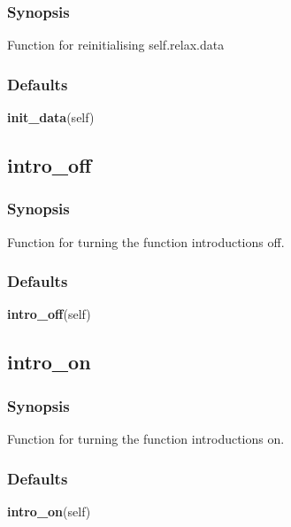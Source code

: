   
 \subsubsection{Synopsis} 

 Function for reinitialising self.relax.data 
  

  
 \subsubsection{Defaults} 

 \textsf{\textbf{init\_data}(self)} 

  

 \newpage 

 \subsection{intro\_off} 

  
 \subsubsection{Synopsis} 

 Function for turning the function introductions off. 
  

  
 \subsubsection{Defaults} 

 \textsf{\textbf{intro\_off}(self)} 

  

 \newpage 

 \subsection{intro\_on} 

  
 \subsubsection{Synopsis} 

 Function for turning the function introductions on. 
  

  
 \subsubsection{Defaults} 

 \textsf{\textbf{intro\_on}(self)} 

